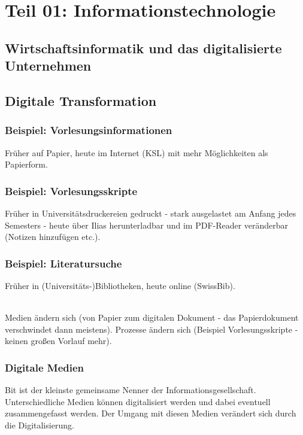 \documentclass{article}
\begin{document}
	\pagestyle{fancy}
	
	\section*{Teil 01: Informationstechnologie}
	\begin{adjustwidth}{2em}{2em}
		\section{Wirtschaftsinformatik und das digitalisierte Unternehmen}
		\begin{adjustwidth}{2em}{2em}
			\subsection{Digitale Transformation}
			\begin{adjustwidth}{1em}{}
				\subsubsection{Beispiel: Vorlesungsinformationen}
				\begin{adjustwidth}{1em}{}
					Früher auf Papier, heute im Internet (KSL) mit mehr Möglichkeiten als Papierform.
				\end{adjustwidth}
				\subsubsection{Beispiel: Vorlesungsskripte}
				\begin{adjustwidth}{1em}{}
					Früher in Universitätsdruckereien gedruckt - stark ausgelastet am Anfang jedes Semesters - heute über Ilias herunterladbar und im PDF-Reader veränderbar (Notizen hinzufügen etc.).
				\end{adjustwidth}
				\subsubsection{Beispiel: Literatursuche}
				\begin{adjustwidth}{1em}{}
					Früher in (Universitäts-)Bibliotheken, heute online (SwissBib).
				\end{adjustwidth}
				\hfill \\
				Medien ändern sich (von Papier zum digitalen Dokument - das Papierdokument verschwindet dann meistens). Prozesse ändern sich (Beispiel Vorlesungsskripte - keinen großen Vorlauf mehr).
				\subsubsection{Digitale Medien}
				\begin{adjustwidth}{1em}{}
					Bit ist der kleinste gemeinsame Nenner der Informationsgesellschaft. Unterschiedliche Medien können digitalisiert werden und dabei eventuell zusammengefasst werden. Der Umgang mit diesen Medien verändert sich durch die Digitalisierung.
				\end{adjustwidth}
			\end{adjustwidth}

\end{adjustwidth}
\end{adjustwidth}
\end{document}
